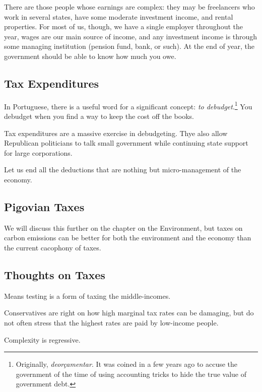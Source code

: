 There are those people whose earnings are complex: they may be freelancers who
work in several states, have some moderate investment income, and rental
properties. For most of us, though, we have a single employer throughout the
year, wages are our main source of income, and any investment income is through
some managing institution (pension fund, bank, or such). At the end of year,
the government should be able to know how much you owe.

\subsection{Tax Expenditures}

In Portuguese, there is a useful word for a significant concept: \emph{to
debudget}.\footnote{Originally, \emph{deorçamentar}. It was coined in a few
years ago to accuse the government of the time of using accounting tricks to
hide the true value of government debt.} You debudget when you find a way to
keep the cost off the books.

Tax expenditures are a massive exercise in debudgeting. Thye also allow
Republican politicians to talk small government while continuing state support
for large corporations.

Let us end all the deductions that are nothing but micro-management of the
economy.

\subsection{Pigovian Taxes}

We will discuss this further on the chapter on the Environment, but taxes on
carbon emissions can be better for both the environment and the economy than
the current cacophony of taxes.

\subsection{Thoughts on Taxes}

\thought Means testing is a form of taxing the middle-incomes.

\thought Conservatives are right on how high marginal tax rates can be
damaging, but do not often stress that the highest rates are paid by low-income
people.

\thought Complexity is regressive.


